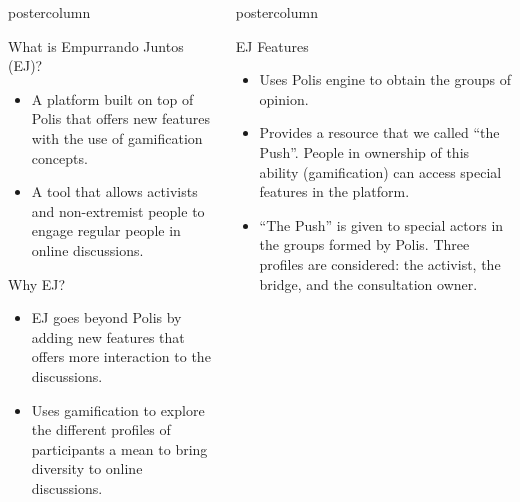 \documentclass[final,hyperref={pdfpagelabels=false}]{beamer}
\newlength{\columnheight}
\begin{document}
\begin{frame}
\begin{columns}
\begin{column}{.49\textwidth}
\begin{beamercolorbox}[center,wd=\textwidth]{postercolumn}
\begin{minipage}[T]{.95\textwidth}
{\begin{block}{What is Empurrando Juntos (EJ)?}
\begin{itemize}
    \item A platform built on top of Polis that offers new features
    with the use of gamification concepts.

    \item A tool that allows activists and non-extremist people to engage regular
    people in online discussions.
  \end{itemize}
\end{block}

\begin{block}{Why EJ?}
  \begin{itemize}
    \item EJ goes beyond Polis by adding new features that offers more interaction
    to the discussions.

    \item Uses gamification to explore the different profiles of participants
    a mean to bring diversity to online discussions.
  \end{itemize}
\end{block}


}
\end{minipage}
\end{beamercolorbox}
\end{column}

\begin{column}{.49\textwidth}
  \begin{beamercolorbox}[center,wd=\textwidth]{postercolumn}
    \begin{minipage}[T]{.95\textwidth} %
      \parbox[t][\columnheight]{\textwidth}{ %

\begin{block}{EJ Features}
  \begin{itemize}
    \item Uses Polis engine to obtain the groups of opinion.

    \item Provides a resource that we called ``the Push''. People in ownership of
    this ability (gamification) can access special features in the platform.

    \item ``The Push'' is given to special actors in the groups formed by Polis.
    Three profiles are considered: the activist, the bridge, and the consultation
    owner.


\end{itemize}
\end{block}}
\end{minipage}
\end{beamercolorbox}
\end{column}
\end{columns}
\end{frame}
\end{document}
